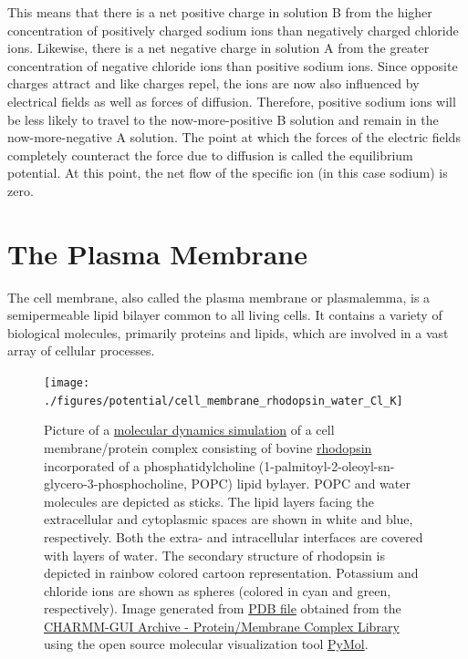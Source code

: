 This means that there is a net positive charge in solution B from the higher concentration of positively charged sodium ions than negatively charged chloride ions. Likewise, there is a net negative charge in solution A from the greater concentration of negative chloride ions than positive sodium ions. Since opposite charges attract and like charges repel, the ions are now also influenced by electrical fields as well as forces of diffusion. Therefore, positive sodium ions will be less likely to travel to the now-more-positive B solution and remain in the now-more-negative A solution. The point at which the forces of the electric fields completely counteract the force due to diffusion is called the equilibrium potential. At this point, the net flow of the specific ion (in this case sodium) is zero.

\hypertarget{the-plasma-membrane}{%
\section{The Plasma Membrane}\label{the-plasma-membrane}}

The cell membrane, also called the plasma membrane or plasmalemma, is a semipermeable lipid bilayer common to all living cells. It contains a variety of biological molecules, primarily proteins and lipids, which are involved in a vast array of cellular processes.



\begin{figure}

{\centering \texttt{[image: ./figures/potential/cell\_membrane\_rhodopsin\_water\_Cl\_K]} 

}

\caption{Picture of a \href{https://doi.org/10.1371/journal.pone.0000880}{molecular dynamics simulation} of a cell membrane/protein complex consisting of bovine \href{https://en.wikipedia.org/wiki/Rhodopsin}{rhodopsin} incorporated of a phosphatidylcholine (1-palmitoyl-2-oleoyl-sn-glycero-3-phosphocholine, POPC) lipid bylayer. POPC and water molecules are depicted as sticks. The lipid layers facing the extracellular and cytoplasmic spaces are shown in white and blue, respectively. Both the extra- and intracellular interfaces are covered with layers of water. The secondary structure of rhodopsin is depicted in rainbow colored cartoon representation. Potassium and chloride ions are shown as spheres (colored in cyan and green, respectively). Image generated from \href{http://www.charmm-gui.org/archive/complex/1gzm_rect_popc.pdb}{PDB file} obtained from the \href{http://www.charmm-gui.org/?doc=archive\&lib=complex}{CHARMM-GUI Archive - Protein/Membrane Complex Library} using the open source molecular visualization tool \href{https://pymol.org/2/}{PyMol}.}\label{fig:cellmembrane}
\end{figure}

